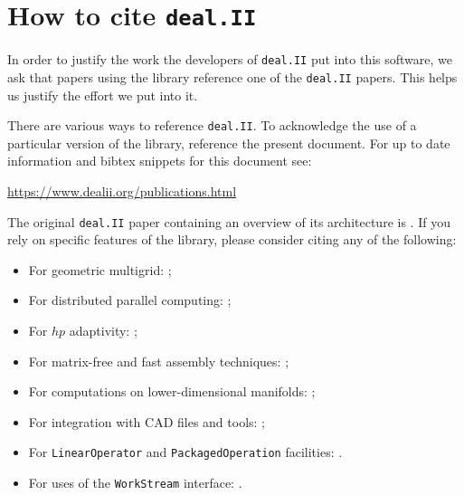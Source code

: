 \documentclass{ansarticle-preprint}
\newcommand{\specialword}[1]{\texttt{#1}}
\newcommand{\dealii}{{\specialword{deal.II}}}
\begin{document}
\section{How to cite \dealii{}}\label{sec:cite}

In order to justify the work the developers of \dealii{} put into this
software, we ask that papers using the library reference one of the
\dealii{} papers. This helps us justify the effort we put into it.

There are various ways to reference \dealii{}. To acknowledge the use of a
particular version of the library, reference the present document. For up
to date information and bibtex snippets for this document see:

\bigskip

\begin{center}
 \url{https://www.dealii.org/publications.html}
\end{center}

\bigskip


The original \texttt{\dealii{}} paper containing an overview of its
architecture is \cite{BangerthHartmannKanschat2007}. If you rely on specific
features of the library, please consider citing any of the following:
\begin{itemize}
 \item For geometric multigrid: \cite{Kanschat2004,JanssenKanschat2011};
 \item For distributed parallel computing: \cite{BangerthBursteddeHeisterKronbichler11};
 \item For $hp$ adaptivity: \cite{BangerthKayserHerold2007};
 \item For matrix-free and fast assembly techniques:
   \cite{KronbichlerKormann2012};
 \item For computations on lower-dimensional manifolds:
   \cite{DeSimoneHeltaiManigrasso2009};
 \item For integration with CAD files and tools:
   \cite{HeltaiMola2015};
 \item For \texttt{LinearOperator} and \texttt{PackagedOperation} facilities:
   \cite{MaierBardelloniHeltai-2015-a}.
 \item For uses of the \texttt{WorkStream} interface:
   \cite{TKB16}.
\end{itemize}
\end{document}
